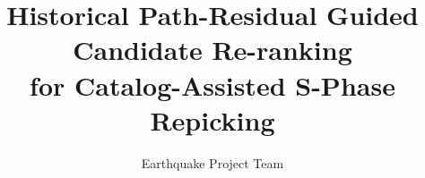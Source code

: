 \documentclass[11pt,a4paper]{article}
\title{Historical Path-Residual Guided Candidate Re-ranking\\ for Catalog-Assisted S-Phase Repicking}
\author{Earthquake Project Team}
\date{}
\begin{document}
\maketitle
\begin{abstract}

\end{abstract}
\tableofcontents
\newpage











\end{document}
